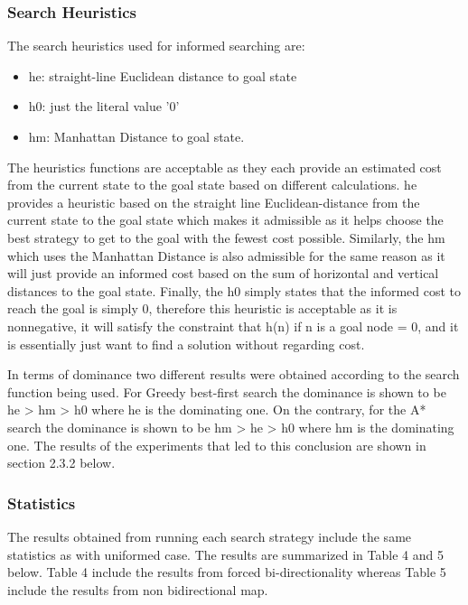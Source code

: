 \documentclass[12pt, letter]{article}
\begin{document}
\subsubsection{Search Heuristics}

The search heuristics used for informed searching are:
\begin{itemize}
	\item he: straight-line Euclidean distance to goal state
	\item h0: just the literal value '0'
	\item hm: Manhattan Distance to goal state. 
\end{itemize}

The heuristics functions are acceptable as they each provide an estimated cost from the current state to the goal state based on different calculations. he provides a heuristic based on the straight line Euclidean-distance from the current state to the goal state which makes it admissible as it helps choose the best strategy to get to the goal with the fewest cost possible. Similarly, the hm which uses the Manhattan Distance is also admissible for the same reason as it will just provide an informed cost based on the sum of horizontal and vertical distances to the goal state. Finally, the h0 simply states that the informed cost to reach the goal is simply 0, therefore this heuristic is acceptable as it is nonnegative, it will satisfy the constraint that h(n) if n is a goal node = 0, and it is essentially just want to find a solution without regarding cost. 

In terms of dominance two different results were obtained according to the search function being used. For Greedy best-first search the dominance is shown to be he > hm > h0 where he is the dominating one. On the contrary, for the A* search the dominance is shown to be hm > he > h0 where hm is the dominating one. The results of the experiments that led to this conclusion are shown in section 2.3.2 below. 

\subsubsection{Statistics}

The results obtained from running each search strategy include the same statistics as with uniformed case. The results are summarized in Table 4 and 5 below. Table 4 include the results from forced bi-directionality whereas Table 5 include the results from non bidirectional map. 
\end{document}
